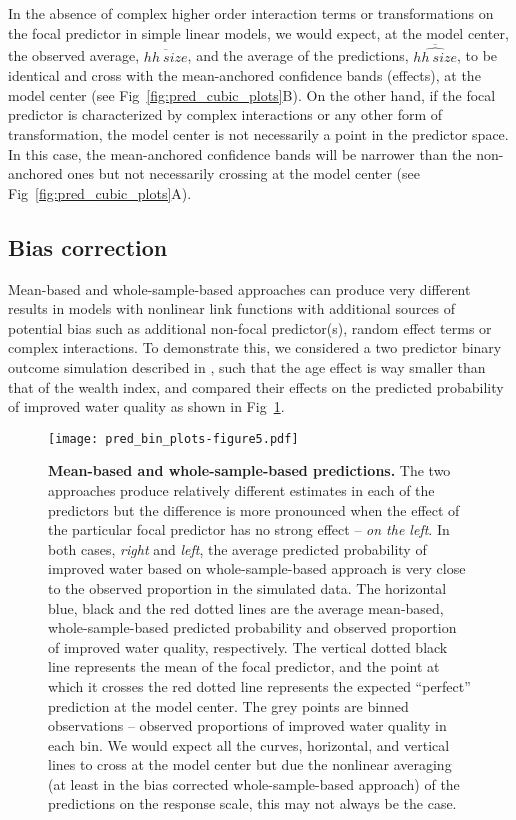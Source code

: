 \documentclass[10pt,letterpaper]{article}
\let\over=\overline
\begin{document}
In the absence of complex higher order interaction terms or transformations on the focal predictor in simple linear models, we would expect, at the model center, the observed average, $\over{hh~size}$, and the average of the predictions, $\over{\widehat{hh~size}}$, to be identical and cross with the mean-anchored confidence bands (effects), at the model center (see Fig~\ref{fig:pred_cubic_plots}B). On the other hand, if the focal predictor is characterized by complex interactions or any other form of transformation, the model center is not necessarily a point in the predictor space. In this case, the mean-anchored confidence bands will be narrower than the non-anchored ones but not necessarily crossing at the model center (see Fig~\ref{fig:pred_cubic_plots}A).

\subsection*{Bias correction}

Mean-based and whole-sample-based approaches can produce very different results in models with nonlinear link functions with additional sources of potential bias such as additional non-focal predictor(s), random effect terms or complex interactions. To demonstrate this, we considered a two predictor binary outcome simulation described in , such that the age effect is way smaller than that of the wealth index, and compared their effects on the predicted probability of improved water quality as shown in Fig~\ref{fig:pred_bin_plots}. 

\begin{figure}[!h]
\centering
\texttt{[image: pred\_bin\_plots-figure5.pdf]}
\caption{{\bf Mean-based and whole-sample-based predictions.} The two approaches produce relatively different estimates in each of the predictors but the difference is more pronounced when the effect of the particular focal predictor has no strong effect -- \emph{on the left}. In both cases, \emph{right} and \emph{left}, the average predicted probability of improved water based on whole-sample-based approach is very close to the observed proportion in the simulated data. The horizontal blue, black and the red dotted lines are the average mean-based, whole-sample-based predicted probability and observed proportion of improved water quality, respectively. The vertical dotted black line represents the mean of the focal predictor, and the point at which it crosses the red dotted line represents the expected ``perfect'' prediction at the model center. The grey points are binned observations -- observed proportions of improved water quality in each bin. We would expect all the curves, horizontal, and vertical lines to cross at the model center but due the nonlinear averaging (at least in the bias corrected whole-sample-based approach) of the predictions on the response scale, this may not always be the case.} 
\label{fig:pred_bin_plots}
\end{figure}
\end{document}
